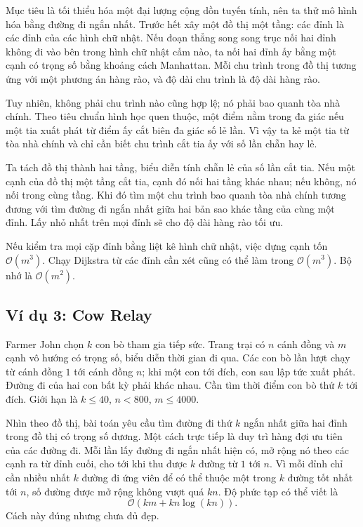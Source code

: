 \documentclass[11pt]{article}
\newcommand{\Oh}{\mathcal{O}}
\begin{document}
Mục tiêu là tối thiểu hóa một đại lượng cộng dồn tuyến tính, nên ta thử mô
hình hóa bằng đường đi ngắn nhất. Trước hết xây một đồ thị một tầng: các đỉnh
là các đỉnh của các hình chữ nhật. Nếu đoạn thẳng song song trục nối hai đỉnh
không đi vào bên trong hình chữ nhật cấm nào, ta nối hai đỉnh ấy bằng một cạnh
có trọng số bằng khoảng cách Manhattan. Mỗi chu trình trong đồ thị tương ứng
với một phương án hàng rào, và độ dài chu trình là độ dài hàng rào.

Tuy nhiên, không phải chu trình nào cũng hợp lệ; nó phải bao quanh tòa nhà
chính. Theo tiêu chuẩn hình học quen thuộc, một điểm nằm trong đa giác nếu một
tia xuất phát từ điểm ấy cắt biên đa giác số lẻ lần. Vì vậy ta kẻ một tia từ
tòa nhà chính và chỉ cần biết chu trình cắt tia ấy với số lần chẵn hay lẻ.

Ta tách đồ thị thành hai tầng, biểu diễn tính chẵn lẻ của số lần cắt tia. Nếu
một cạnh của đồ thị một tầng cắt tia, cạnh đó nối hai tầng khác nhau; nếu
không, nó nối trong cùng tầng. Khi đó tìm một chu trình bao quanh tòa nhà
chính tương đương với tìm đường đi ngắn nhất giữa hai bản sao khác tầng của
cùng một đỉnh. Lấy nhỏ nhất trên mọi đỉnh sẽ cho độ dài hàng rào tối ưu.

Nếu kiểm tra mọi cặp đỉnh bằng liệt kê hình chữ nhật, việc dựng cạnh tốn
\(\Oh(m^3)\). Chạy Dijkstra từ các đỉnh cần xét cũng có thể làm trong
\(\Oh(m^3)\). Bộ nhớ là \(\Oh(m^2)\).

\subsection{Ví dụ 3: Cow Relay}

Farmer John chọn \(k\) con bò tham gia tiếp sức. Trang trại có \(n\) cánh
đồng và \(m\) cạnh vô hướng có trọng số, biểu diễn thời gian đi qua. Các con
bò lần lượt chạy từ cánh đồng \(1\) tới cánh đồng \(n\); khi một con tới đích,
con sau lập tức xuất phát. Đường đi của hai con bất kỳ phải khác nhau. Cần tìm
thời điểm con bò thứ \(k\) tới đích. Giới hạn là \(k\le 40\), \(n<800\),
\(m\le 4000\).

Nhìn theo đồ thị, bài toán yêu cầu tìm đường đi thứ \(k\) ngắn nhất giữa hai
đỉnh trong đồ thị có trọng số dương. Một cách trực tiếp là duy trì hàng đợi ưu
tiên của các đường đi. Mỗi lần lấy đường đi ngắn nhất hiện có, mở rộng nó theo
các cạnh ra từ đỉnh cuối, cho tới khi thu được \(k\) đường từ \(1\) tới \(n\).
Vì mỗi đỉnh chỉ cần nhiều nhất \(k\) đường đi ứng viên để có thể thuộc một
trong \(k\) đường tốt nhất tới \(n\), số đường được mở rộng không vượt quá
\(kn\). Độ phức tạp có thể viết là
\[
  \Oh(km+kn\log(kn)).
\]
Cách này đúng nhưng chưa đủ đẹp.
\end{document}

